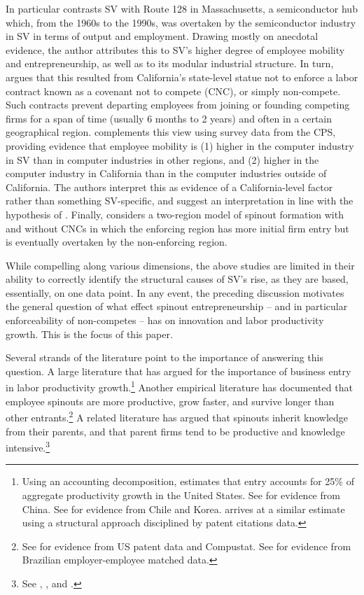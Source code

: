 \documentclass[12pt,english]{article}
\theoremstyle{remark}
\begin{document}
In particular \cite{saxenian_regional_1994} contrasts SV with Route 128 in Massachusetts, a semiconductor hub which, from the 1960s to the 1990s, was overtaken by the semiconductor industry in SV in terms of output and employment. Drawing mostly on anecdotal evidence, the author attributes this to SV's higher degree of employee mobility and entrepreneurship, as well as to its modular industrial structure. In turn, \cite{gilson_legal_1999} argues that this resulted from California's state-level statue not to enforce a labor contract known as a covenant not to compete (CNC), or simply non-compete. Such contracts prevent departing employees from joining or founding competing firms for a span of time (usually 6 months to 2 years) and often in a certain geographical region. \cite{fallick_job-hopping_2006} complements this view using survey data from the CPS, providing evidence that employee mobility is (1) higher in the computer industry in SV than in computer industries in other regions, and (2) higher in the computer industry in California than in the computer industries outside of California. The authors interpret this as evidence of a California-level factor rather than something SV-specific, and suggest an interpretation in line with the hypothesis of \cite{gilson_legal_1999}. Finally, \cite{franco_covenants_2008} considers a two-region model of spinout formation with and without CNCs in which the enforcing region has more initial firm entry but is eventually overtaken by the non-enforcing region. 

While compelling along various dimensions, the above studies are limited in their ability to correctly identify the structural causes of SV's rise, as they are based, essentially, on one data point. In any event, the preceding discussion motivates the general question of what effect spinout entrepreneurship -- and in particular enforceability of non-competes -- has on innovation and labor productivity growth. This is the focus of this paper.

Several strands of the literature point to the importance of answering this question. A large literature that has argued for the importance of business entry in labor productivity growth.\footnote{Using an accounting decomposition, \cite{foster_aggregate_2001} estimates that entry accounts for 25\% of aggregate productivity growth in the United States. See \cite{brandt_creative_2012} for evidence from China. See \cite{asturias_firm_2019} for evidence from Chile and Korea. \cite{akcigit_growth_2018} arrives at a similar estimate using a structural approach disciplined by patent citations data.} Another empirical literature has documented that employee spinouts are more productive, grow faster, and survive longer than other entrants.\footnote{See \cite{baslandze_spinout_2019} for evidence from US patent data and Compustat. See \cite{muendler_employee_2012} for evidence from Brazilian employer-employee matched data.} A related literature has argued that spinouts inherit knowledge from their parents, and that parent firms tend to be productive and knowledge intensive.\footnote{See \cite{klepper_entry_2005}, \cite{gompers_entrepreneurial_2005}, and \cite{baslandze_spinout_2019}.} 
\end{document}
